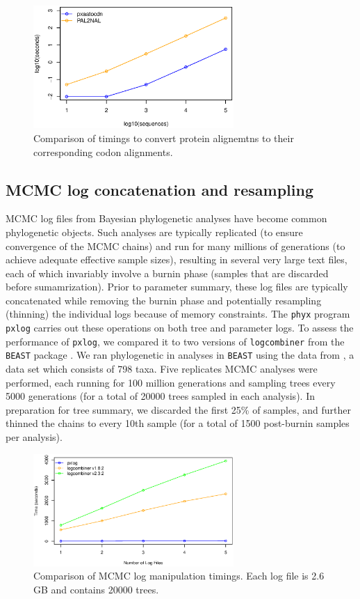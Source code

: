 \documentclass{article}
\begin{document}
\begin{figure}[h]
    \centering
    \includegraphics[width=3.0in]{aatocdn}
    \caption{Comparison of timings to convert protein alignemtns to
    their corresponding codon alignments.}
    \label{proteincodonfigure}
\label{fig:S2}
\end{figure}

\subsection{MCMC log concatenation and resampling}
MCMC log files from Bayesian phylogenetic analyses have become common phylogenetic objects. Such analyses are typically replicated (to ensure convergence of the MCMC chains) and run for many millions of generations (to achieve adequate effective sample sizes), resulting in several very large text files, each of which invariably involve a burnin phase (samples that are discarded before sumamrization). Prior to parameter summary, these log files are typically concatenated while removing the burnin phase and potentially resampling (thinning) the individual logs because of memory constraints. The \texttt{phyx} program \texttt{pxlog} carries out these operations on both tree and parameter logs. To assess the performance of \texttt{pxlog}, we compared it to two versions of \texttt{logcombiner} from the \texttt{BEAST} package \citep{DrummondRambaut2007,Bouckaert2014}. We ran phylogenetic in analyses in \texttt{BEAST} using the data from \cite{Magallon2015}, a data set which consists of 798 taxa. Five replicates MCMC analyses were performed, each running for 100 million generations and sampling trees every 5000 generations (for a total of 20000 trees sampled in each analysis). In preparation for tree summary, we discarded the first 25\% of samples, and further thinned the chains to every 10th sample (for a total of 1500 post-burnin samples per analysis).

\begin{figure}[!h]
    \centering
    \includegraphics[width=3.0in]{log}
    \caption{Comparison of MCMC log manipulation timings. Each log file
    is 2.6 GB and contains 20000 trees.}
    \label{logfigure}
\label{fig:S3}
\end{figure}
\end{document}
